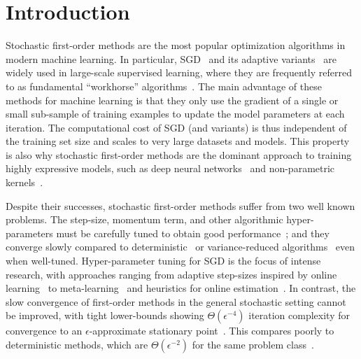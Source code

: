 
\chapter{Introduction}\label{ch:Introduction}

Stochastic first-order methods are the most popular optimization algorithms in modern machine learning.
In particular, \ac{SGD}~\citep{robbins1951sgd} and its adaptive variants~\citep{duchi2011adagrad, tieleman2012rmsprop, zeiler2012adadelta, kingma2015adam} are widely used in large-scale supervised learning, where they are frequently referred to as fundamental ``workhorse'' algorithms~\citep{qian2019improvedrates, assran2019sgpush, grosse2015scaling}. 
The main advantage of these methods for machine learning is that they only use the gradient of a single or small sub-sample of training examples to update the model parameters at each iteration.
The computational cost of \ac{SGD} (and variants) is thus independent of the training set size and scales to very large datasets and models.
This property is also why stochastic first-order methods are the dominant approach to training highly expressive models, such as deep neural networks~\citep{zhang2017understanding, bengio2012practical} and non-parametric kernels~\citep{liang2018just, belkin2019datainterp}.

Despite their successes, stochastic first-order methods suffer from two well known problems. 
The step-size, momentum term, and other algorithmic hyper-parameters must be carefully tuned to obtain good performance~\citep{bengio2012practical, schaul2013no, li2019convergence, choi2019empirical}; and
they converge slowly compared to deterministic~\citep{nesterov2004lectures} or variance-reduced algorithms~\citep{leroux2012sag, johnson2013svrg, defazio2014saga} even when well-tuned.
Hyper-parameter tuning for \ac{SGD} is the focus of intense research, with approaches ranging from adaptive step-sizes inspired by online learning~\citep{luo2019adabound, li2019convergence, orabona2017coin} to meta-learning~\citep{baydin2018hypergradient, schraudolph1999local, sutton1992gain, almeida1998parameter, plagianakos2001learning, shao2000rates} and heuristics for online estimation~\citep{schaul2013no, rolinek2018l4, tan2016bb}.
In contrast, the slow convergence of first-order methods in the general stochastic setting cannot be improved, with tight lower-bounds showing \( \Theta(\epsilon^{-4}) \) iteration complexity for convergence to an \( \epsilon \)-approximate stationary point~\citep{drori2019complexity, arjevani2019lower}.
This compares poorly to deterministic methods, which are \( \Theta(\epsilon^{-2}) \) for the same problem class~\citep{carmon2019lower}.

